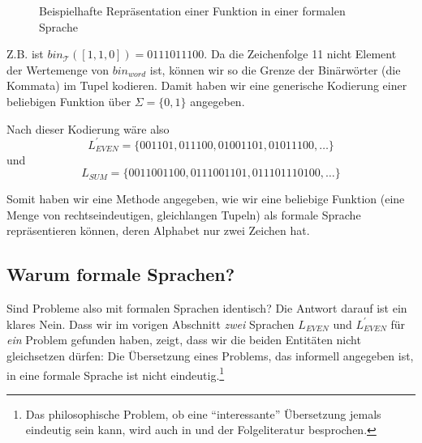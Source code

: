 \begin{figure}[htb]
\centering
    \caption{Beispielhafte Repräsentation einer Funktion in einer formalen Sprache}\label{fig:fl}
\end{figure}

Z.B. ist $bin_{\mathcal{T}}([1,1,0]) = 0111011100$.
Da die Zeichenfolge 11 nicht Element der Wertemenge von $bin_{word}$ ist,
können wir so die Grenze der Binärwörter (die Kommata) im Tupel kodieren.
Damit haben wir eine generische Kodierung einer beliebigen Funktion
über $\Sigma = \{0,1\}$ angegeben.

Nach dieser Kodierung wäre also
\[
    L_{EVEN}^{'} = \{001101, 011100, 01001101, 01011100, \ldots \}
\]
und
\[
    L_{SUM} = \{0011001100, 0111001101, 011101110100, \ldots \}
\]

Somit haben wir eine Methode angegeben,
wie wir eine beliebige Funktion
(eine Menge von rechtseindeutigen, gleichlangen Tupeln)
als formale Sprache repräsentieren können,
deren Alphabet nur zwei Zeichen hat.


\subsection{Warum formale Sprachen?}\label{subsec:warumFormaleSprachen}

Sind Probleme also mit formalen Sprachen identisch?
Die Antwort darauf ist ein klares Nein.
Dass wir im vorigen Abschnitt \emph{zwei} Sprachen
$L_{EVEN}$ und $L_{EVEN}^{'}$ für \emph{ein} Problem gefunden haben,
zeigt, dass wir die beiden Entitäten nicht gleichsetzen dürfen:
Die Übersetzung eines Problems, das informell angegeben ist,
in eine formale Sprache ist nicht eindeutig.\footnote{
Das philosophische Problem, ob eine ``interessante'' Übersetzung jemals eindeutig sein kann,
wird auch in \cite{quine} und der Folgeliteratur besprochen.}

